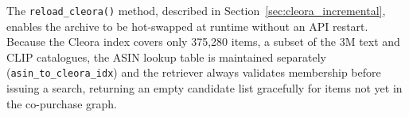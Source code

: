 The \texttt{reload\_cleora()} method, described in Section~\ref{sec:cleora_incremental}, enables the archive to be hot-swapped at runtime without an API restart.
Because the Cleora index covers only 375{,}280 items, a subset of the 3M text and CLIP catalogues, the ASIN lookup table is maintained separately (\texttt{asin\_to\_cleora\_idx}) and the retriever always validates membership before issuing a search, returning an empty candidate list gracefully for items not yet in the co-purchase graph.
